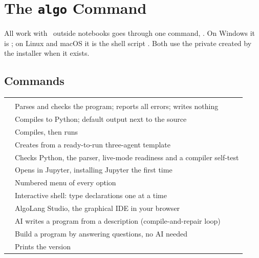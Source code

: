 \chapter{The \texttt{algo} Command}
\label{ch:cli}

All work with \algolang\ outside notebooks goes through one command, . On Windows it is ; on Linux and macOS it is the shell script . Both use the private  created by the installer when it exists.


\section{Commands}

\begin{center}
\small
\begin{tabularx}{\linewidth}{@{}L{5.2cm}Y@{}}
\toprule
{} & \\
\goldrule
{} & Parses and checks the program; reports all errors; writes nothing\\
 & Compiles to Python; default output  next to the source\\
 & Compiles, then runs \\
 & Creates  from a ready-to-run three-agent template\\
 & Checks Python, the parser, live-mode readiness and a compiler self-test\\
 & Opens  in Jupyter, installing Jupyter the first time\\
 & Numbered menu of every option\\
 & Interactive shell: type declarations one at a time\\
 & AlgoLang Studio, the graphical IDE in your browser\\
 & AI writes a program from a description (compile-and-repair loop)\\
 & Build a program by answering questions, no AI needed\\
 & Prints the version\\
\bottomrule
\end{tabularx}
\end{center}

